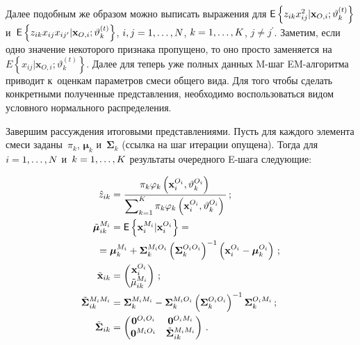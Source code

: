 \begin{multicols}{2}
Далее подобным же образом можно выписать выражения для
${\sf E}\left\{ z_{ik} x_{ij}^2\vert \mathbf{x}_{O,i};\vartheta_k^{(t)}\right\}$ 
и~${\sf E}\left\{ z_{ik}x_{ij}x_{ij^\prime}\vert 
\mathbf{x}_{O,i};\vartheta_k^{(t)}\right\}$, $i,j\hm=1,\ldots , N$, $k\hm=1,\ldots , 
K$, $j\not= j^\prime$. Заметим, если одно значение некоторого признака 
пропущено, то оно просто заменяется на $E\left\{ 
x_{ij}\vert\mathbf{x}_{O,i};\vartheta_k^{(t)}\right\}$. Далее для теперь уже 
полных данных M-шаг EM-ал\-го\-рит\-ма приводит к~оценкам параметров 
смеси общего вида. Для того чтобы сделать конкретными полученные 
представления, необходимо воспользоваться видом условного нормального 
распределения.
     
     Завершим рассуждения итоговыми представлениями. Пусть для каждого 
элемента смеси заданы~$\pi_k$, $\boldsymbol{\mu}_k$ и~$\boldsymbol{\Sigma}_k$ 
(ссылка на шаг итерации опущена). Тогда для $i\hm=1,\ldots ,N$ 
и~$k\hm=1,\ldots , K$ результаты очередного E-ша\-га следующие:

\noindent
    \begin{align*}
     \hat{z}_{ik} &= \fr{\pi_k \varphi_k 
\left(\mathbf{x}_i^{O_i},\vartheta_k^{O_i}\right)}{\sum\nolimits^K_{k=1} \pi_k 
\varphi_k\left(\mathbf{x}_i^{O_i},\vartheta_k^{O_i}\right)}\,;
\\
     \tilde{\boldsymbol{\mu}}_{ik}^{M_i}& = {\sf E}\left\{ \mathbf{x}_i^{M_i} \vert 
\mathbf{x}_i^{O_i}\right\} ={}\\
&\hspace*{-5mm}{}={\boldsymbol{\mu}}_k^{M_i} 
+{\boldsymbol{\Sigma}}_k^{M_iO_i}\left({\boldsymbol{\Sigma}}_k^{O_iO_i}
\right)^{-1}\left( \mathbf{x}_i^{O_i}-{\boldsymbol{\mu}}_k^{O_i}\right)\,;\\ 
     \tilde{\mathbf{x}}_{ik}&=\begin{pmatrix}
     \mathbf{x}_i^{O_i}\\
     \tilde{\mu}_{ik}^{M_i}
     \end{pmatrix}\,;
     \\
     \tilde{{\boldsymbol{\Sigma}}}_{ik}^{M_iM_i} &= 
{\boldsymbol{\Sigma}}_k^{M_iM_i}- {\boldsymbol{\Sigma}}_k^{M_iO_i}\left( 
     {\boldsymbol{\Sigma}}_k^{O_iO_i}\right)^{-1} 
{\boldsymbol{\Sigma}}_k^{O_iM_i}\,;\\
     \tilde{{\boldsymbol{\Sigma}}}_{ik}&=\begin{pmatrix}
     \mathbf{0}^{O_iO_i} & \mathbf{0}^{O_iM_i}\\
     \mathbf{0}^{M_iO_i} & \tilde{{\boldsymbol{\Sigma}}}_{ik}^{M_iM_i}
     \end{pmatrix}\,.
    \end{align*}
     

\end{multicols}
